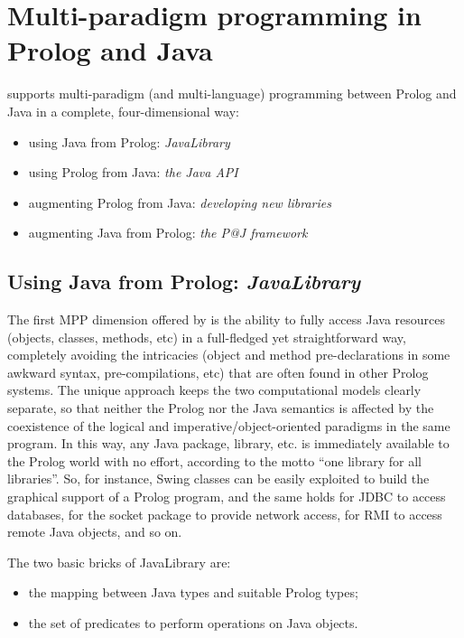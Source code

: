 \chapter{Multi-paradigm programming in Prolog and Java}
\label{ch:mpp-in-java}

\tuprolog{} supports multi-paradigm (and multi-language) programming between Prolog and Java in a complete, four-dimensional way:

\begin{itemize}
  \item using Java from Prolog: \textit{JavaLibrary}
  \item using Prolog from Java: \textit{the Java API}
  \item augmenting Prolog from Java: \textit{developing new libraries}
  \item augmenting Java from Prolog: \textit{the P@J framework}
\end{itemize}

\section{Using Java from Prolog: \textit{JavaLibrary}}
\label{sec:java-library}
The first MPP dimension offered by \tuprolog{} is the ability to fully access Java resources (objects, classes, methods, etc) in a full-fledged yet straightforward way, completely avoiding the intricacies (object and method pre-declarations in some awkward syntax, pre-compilations, etc) that are often found in other Prolog systems.
%
The unique \tuprolog{} approach keeps the two computational models clearly separate, so that neither the Prolog nor the Java semantics is affected by the coexistence of the logical and imperative/object-oriented paradigms in the same program.
%
In this way, any Java package, library, etc. is immediately available to the Prolog world with no effort, according to the motto {``one library for all libraries''}. So, for instance, Swing classes can be easily exploited to build the graphical support of a Prolog program, and the same holds for JDBC to access databases, for the socket package to provide network access, for RMI to access remote Java objects, and so on.

The two basic bricks of JavaLibrary are:
\begin{itemize}
  \item the mapping between Java types and suitable Prolog types;
  \item the set of predicates to perform operations on Java objects.
\end{itemize}

